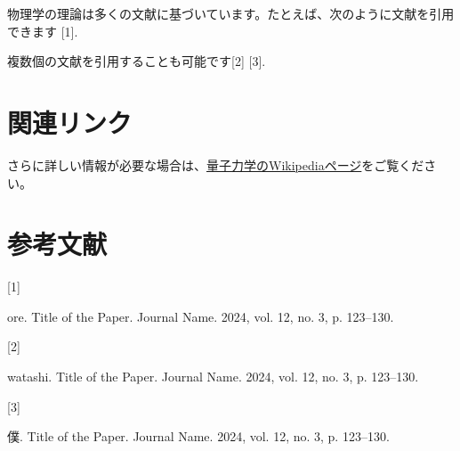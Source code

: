 \documentclass[
  11pt,
  pandoc,
  a4paper,
  pdflatex,
  japaram={jis2004}]{bxjsarticle}
\newlength{\cslhangindent}
\newlength{\csllabelwidth}
\newenvironment{CSLReferences}[2] %
 {\begin{list}{}{%
  \setlength{\itemindent}{0pt}
  \setlength{\leftmargin}{0pt}
  \setlength{\parsep}{0pt}
  \ifodd #1
   \setlength{\leftmargin}{\cslhangindent}
   \setlength{\itemindent}{-1\cslhangindent}
  \fi
  \setlength{\itemsep}{#2\baselineskip}}}
 {\end{list}}
\newcommand{\CSLLeftMargin}[1]{\parbox[t]{\csllabelwidth}{\strut#1\strut}}
\newcommand{\CSLRightInline}[1]{\parbox[t]{\linewidth - \csllabelwidth}{\strut#1\strut}}
\begin{document}
物理学の理論は多くの文献に基づいています。たとえば、次のように文献を引用できます
{[}1{]}.

複数個の文献を引用することも可能です{[}2{]} {[}3{]}.

\section{関連リンク}\label{ux95a2ux9023ux30eaux30f3ux30af}

さらに詳しい情報が必要な場合は、\href{https://en.wikipedia.org/wiki/Quantum_mechanics}{量子力学のWikipediaページ}をご覧ください。

\section*{参考文献}\label{ux53c2ux8003ux6587ux732e}

\label{refs}
\begin{CSLReferences}{0}{0}
\CSLLeftMargin{{[}1{]} }%
\CSLRightInline{ore. Title of the Paper. Journal Name. 2024, vol. 12,
no. 3, p. 123--130.}

\CSLLeftMargin{{[}2{]} }%
\CSLRightInline{watashi. Title of the Paper. Journal Name. 2024, vol.
12, no. 3, p. 123--130.}

\CSLLeftMargin{{[}3{]} }%
\CSLRightInline{僕. Title of the Paper. Journal Name. 2024, vol. 12, no.
3, p. 123--130.}

\end{CSLReferences}
\end{document}
